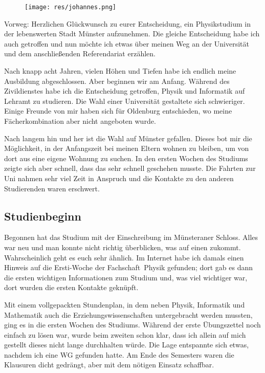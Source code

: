 \begin{multicols*}{2}
\begin{wrapfigure}[7]{r}{0cm}
\centering
\texttt{[image: res/johannes.png]}
\end{wrapfigure}
Vorweg: Herzlichen Glückwunsch zu eurer Entscheidung, ein Physikstudium in der lebenswerten Stadt Münster aufzunehmen. Die gleiche Entscheidung habe ich auch getroffen und nun möchte ich etwas über meinen Weg an der Universität und dem anschließenden Referendariat erzählen. 

Nach knapp acht Jahren, vielen Höhen und Tiefen habe ich endlich meine Ausbildung abgeschlossen. Aber beginnen wir am Anfang. Während des Zivildienstes habe ich die Entscheidung getroffen, Physik und Informatik auf Lehramt zu studieren. Die Wahl einer Universität gestaltete sich schwieriger. Einige Freunde von mir haben sich für Oldenburg entschieden, wo meine Fächerkombination aber nicht angeboten wurde.

Nach langem hin und her ist die Wahl auf Münster gefallen. Dieses bot mir die Möglichkeit, in der Anfangszeit bei meinen Eltern wohnen zu bleiben, um von dort aus eine eigene Wohnung zu suchen. In den ersten Wochen des Studiums zeigte sich aber schnell, dass das sehr schnell geschehen musste. Die Fahrten zur Uni nahmen sehr viel Zeit in Anspruch und die Kontakte zu den anderen Studierenden waren erschwert.

\subsection*{Studienbeginn}
Begonnen hat das Studium mit der Einschreibung im Münsteraner Schloss. Alles war neu und man konnte nicht richtig überblicken, was auf einen zukommt. Wahrscheinlich geht es euch sehr ähnlich. Im Internet habe ich damals einen Hinweis auf die Ersti-Woche der Fachschaft~Physik gefunden; dort gab es dann die ersten wichtigen Informationen zum Studium und, was viel wichtiger war, dort wurden die ersten Kontakte geknüpft.

Mit einem vollgepackten Stundenplan, in dem neben Physik, Informatik und Mathematik auch die Erziehungswissenschaften untergebracht werden mussten, ging es in die ersten Wochen des Studiums. Während der erste Übungszettel noch einfach zu lösen war, wurde beim zweiten schon klar, dass ich allein auf mich gestellt dieses nicht lange durchhalten würde. Die Lage entspannte sich etwas, nachdem ich eine WG gefunden hatte. Am Ende des Semesters waren die Klausuren dicht gedrängt, aber mit dem nötigen Einsatz schaffbar.


\end{multicols*}
